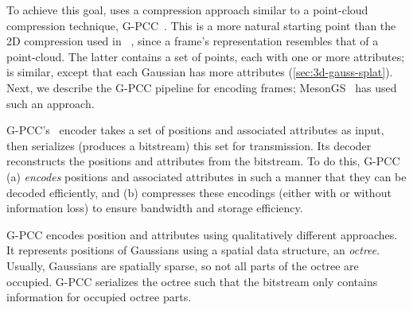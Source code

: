 

%
To achieve this goal, \gsnfs{} uses a compression approach similar to a point-cloud compression technique, G-PCC~\cite{gpcc}.
%
This is a more natural starting point than the 2D compression used in \vthree{}~\cite{v3volumetric}, since a \gs{} frame's representation resembles that of a point-cloud.
%
The latter contains a set of points, each with one or more attributes; \gs{} is similar, except that each Gaussian has more attributes (\cref{sec:3d-gauss-splat}).
%
Next, we describe the G-PCC pipeline for encoding \gs{} frames; MesonGS~\cite{mesongs} has used such an approach.

G-PCC's~\cite{gpcc} encoder takes a set of positions and associated attributes as input, then serializes (produces a bitstream) this set for transmission.
%
Its decoder reconstructs the positions and attributes from the bitstream.
%
To do this, G-PCC (a) \textit{encodes} positions and associated attributes in such a manner that they can be decoded efficiently, and (b) compresses these encodings (either with or without information loss) to ensure bandwidth and storage efficiency.

G-PCC encodes position and attributes using qualitatively different approaches.
%
It represents positions of Gaussians using a spatial data structure, an \textit{octree}.
%
Usually, \gs{} Gaussians are spatially sparse, so not all parts of the octree are occupied.
%
G-PCC serializes the octree such that the bitstream only contains information for occupied octree parts.

